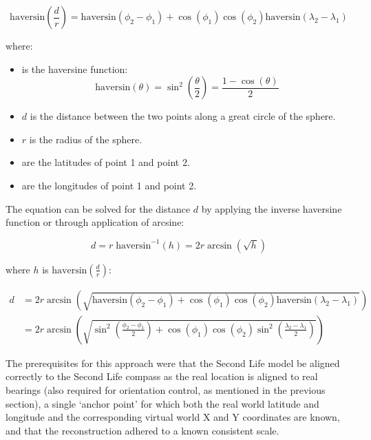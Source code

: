 \begin{equation}
\label{haversine1}
\text{haversin}\left(\frac{d}{r}\right) = \text{haversin}(\phi_{2}-\phi_{1})+\cos(\phi_{1})\cos(\phi_{2})\text{haversin}(\lambda_{2}-\lambda_{1})
\end{equation}

where:

\begin{itemize}
	\item {} is the haversine function:
		\begin{equation}
		\label{harsine2}
			\text{haversin}(\theta) = \sin^{2}\left( \frac{\theta}{2}\right) = \frac{1-\cos(\theta)}{2}
		\end{equation}
	\item $d$ is the distance between the two points along a great circle of the sphere.
	\item $r$ is the radius of the sphere.
	\item {} are the latitudes of point 1 and point 2.
	\item {} are the longitudes of point 1 and point 2.
\end{itemize}

The equation can be solved for the distance $d$ by applying the inverse haversine function or through application of arcsine:

\begin{equation}
	\label{haversine3}
	d = r\;\text{haversin}^{-1}\left( h \right) = 2r \arcsin \left( \sqrt{h} \right)
\end{equation}

where $h$ is $\text{haversin}\left( \frac{d}{r} \right)$:

\begin{align}
d & = 2r \arcsin\left( \sqrt{\text{haversin} \left( \phi_{2} - \phi_{1} \right) + \cos \left( \phi_{1} \right) \cos  \left( \phi_{2} \right) \text{haversin} \left( \lambda_{2} - \lambda_{1} \right) } \right) \nonumber \\ 
& = 2r \arcsin\left( \sqrt{\sin^{2} \left( \frac{\phi_{2} - \phi_{1}}{2}\right) + \cos\left( \phi_{1} \right) \cos\left( \phi_{2} \right) \sin^{2} \left( \frac{\lambda_{2} - \lambda_{1}}{2} \right) } \right)
\end{align}

The prerequisites for this approach were that the Second Life model be aligned correctly to the Second Life compass as the real location is aligned to real bearings (also required for orientation control, as mentioned in the previous section), a single `anchor point' for which both the real world latitude and longitude and the corresponding virtual world X and Y coordinates are known, and that the reconstruction adhered to a known consistent scale.

